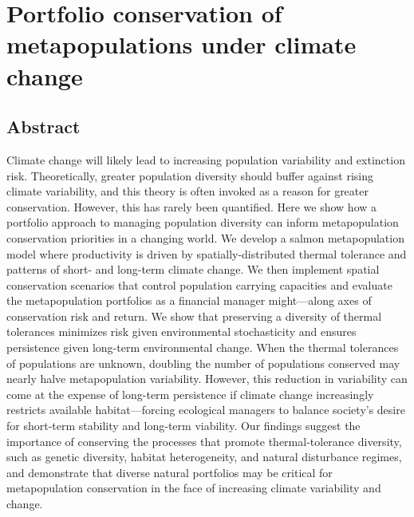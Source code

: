 \chapter[Metapopulation portfolio conservation]{Portfolio conservation of
  metapopulations under climate change\footnotemark{}}

\newcommand{\somR}{Appendix A}
\newcommand{\somparam}{Appendix B}
\newcommand{\somstray}{Appendix C}
\newcommand{\somsens}{Appendix D}
\newcommand{\somcor}{Appendix E}
\newcommand{\somts}{Appendix F}

\section{Abstract}\label{abstract}

Climate change will likely lead to increasing population variability and
extinction risk. Theoretically, greater population diversity should buffer
against rising climate variability, and this theory is often invoked as a
reason for greater conservation. However, this has rarely been quantified.
Here we show how a portfolio approach to managing population diversity can
inform metapopulation conservation priorities in a changing world. We develop
a salmon metapopulation model where productivity is driven by
spatially-distributed thermal tolerance and patterns of short- and long-term
climate change. We then implement spatial conservation scenarios that control
population carrying capacities and evaluate the metapopulation portfolios as a
financial manager might---along axes of conservation risk and return. We
show that preserving a diversity of thermal tolerances minimizes risk given
environmental stochasticity and ensures persistence given long-term
environmental change. When the thermal tolerances of populations are unknown,
doubling the number of populations conserved may nearly halve metapopulation
variability. However, this reduction in variability can come at the expense of
long-term persistence if climate change increasingly restricts available
habitat---forcing ecological managers to balance society's desire for
short-term stability and long-term viability. Our findings suggest the
importance of conserving the processes that promote thermal-tolerance
diversity, such as genetic diversity, habitat heterogeneity, and natural
disturbance regimes, and demonstrate that diverse natural portfolios may be
critical for metapopulation conservation in the face of increasing climate
variability and change.


